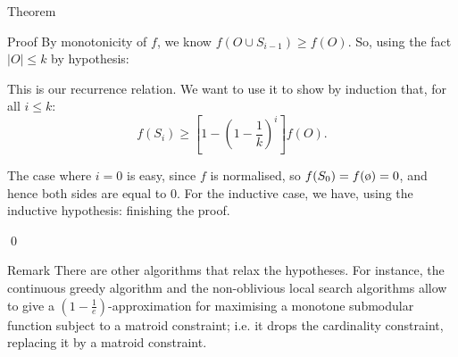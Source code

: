 \documentclass[a4paper]{article}
\begin{document}
\begin{parag}{Theorem}
\begin{subparag}{Proof}
        By monotonicity of $f$, we know $f\left(O \cup S_{i-1}\right) \geq f\left(O\right)$. So, using the fact $\left|O\right| \leq k$ by hypothesis: 

        This is our recurrence relation. We want to use it to show by induction that, for all $i \leq k$: 
        \[f\left(S_i\right) \geq \left[1 - \left(1 - \frac{1}{k}\right)^i\right]f\left(O\right).\]

        The case where $i = 0$ is easy, since $f$ is normalised, so $f\left(S_0\right) = f\left(\o\right) = 0$, and hence both sides are equal to $0$. For the inductive case, we have, using the inductive hypothesis: 
        finishing the proof.

        \qed
    \end{subparag}

    \begin{subparag}{Remark}
        There are other algorithms that relax the hypotheses. For instance, the continuous greedy algorithm and the non-oblivious local search algorithms allow to give a $\left(1 - \frac{1}{e}\right)$-approximation for maximising a monotone submodular function subject to a matroid constraint; i.e. it drops the cardinality constraint, replacing it by a matroid constraint.
    \end{subparag}
\end{parag}
\end{document}
